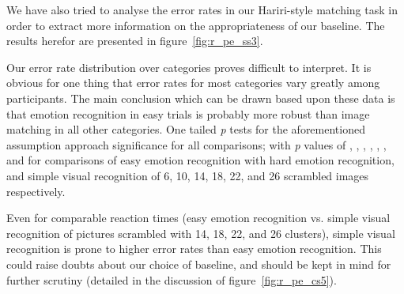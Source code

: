 	    We have also tried to analyse the error rates in our Hariri-style matching task in order to extract more information on the appropriateness of our baseline.
	    The results herefor are presented in figure~\ref{fig:r_pe_ss3}.
	    
	    Our error rate distribution over categories proves difficult to interpret.
	    It is obvious for one thing that error rates for most categories vary greatly among participants.
	    The main conclusion which can be drawn based upon these data is that emotion recognition in easy trials is probably more robust than image matching in all other categories.
	    One tailed \textit{p} tests for the aforementioned assumption approach significance for all comparisons; 
	    with \textit{p} values of 
	    ,
	    ,
	    ,
	    ,
	    ,
	    , and
	    for comparisons of easy emotion recognition with hard emotion recognition, and simple visual recognition of \SI{6}{\pixel}, \SI{10}{\pixel}, \SI{14}{\pixel}, \SI{18}{\pixel}, \SI{22}{\pixel}, and \SI{26}{\pixel} scrambled images respectively.
	    
	    Even for comparable reaction times (easy emotion recognition vs. simple visual recognition of pictures scrambled with \SI{14}{\pixel}, \SI{18}{\pixel}, \SI{22}{\pixel}, and \SI{26}{\pixel} clusters), simple visual recognition is prone to higher error rates than easy emotion recognition.
	    This could raise doubts about our choice of baseline, and should be kept in mind for further scrutiny (detailed in the discussion of figure~\ref{fig:r_pe_cs5}).
